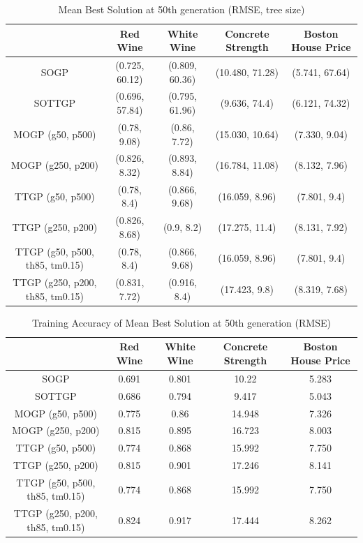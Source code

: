 \documentclass[a4paper, twocolumn]{article}
\begin{document}
\begin{table}[t]
	\begin{center}
		\caption{Mean Best Solution at 50th generation (RMSE, tree size)}
		\label{table:1}
		\begin{tabular}{ c|cccc }
			& Red Wine & White Wine & Concrete Strength & Boston House Price\\
			\hline
			SOGP &(0.725, 60.12)&(0.809, 60.36)&(10.480, 71.28)&(5.741, 67.64)\\
			SOTTGP &(0.696, 57.84)&(0.795, 61.96)&(9.636, 74.4)&(6.121, 74.32)\\
			MOGP (g50, p500) &(0.78, 9.08)&(0.86, 7.72)&(15.030, 10.64)&(7.330, 9.04)\\
			MOGP (g250, p200) &(0.826, 8.32)&(0.893, 8.84)&(16.784, 11.08)&(8.132, 7.96)\\
			TTGP (g50, p500) &(0.78, 8.4)&(0.866, 9.68)&(16.059, 8.96)&(7.801, 9.4)\\
			TTGP (g250, p200) &(0.826, 8.68)&(0.9, 8.2)&(17.275, 11.4)&(8.131, 7.92)\\
			TTGP (g50, p500, th85, tm0.15) &(0.78, 8.4)&(0.866, 9.68)&(16.059, 8.96)&(7.801, 9.4)\\
			TTGP (g250, p200, th85, tm0.15) &(0.831, 7.72)&(0.916, 8.4)&(17.423, 9.8)&(8.319, 7.68)\\
		\end{tabular}
	\end{center}
\end{table}
\begin{table}[t]
	\begin{center}
		\caption{Training Accuracy of Mean Best Solution at 50th generation (RMSE)}
		\label{table:2}
		\begin{tabular}{ c|cccc }
			& Red Wine & White Wine & Concrete Strength & Boston House Price\\
			\hline
			SOGP &0.691&0.801&10.22&5.283\\
			SOTTGP &0.686&0.794&9.417&5.043\\
			MOGP (g50, p500) &0.775&0.86&14.948&7.326\\
			MOGP (g250, p200) &0.815&0.895&16.723&8.003\\
			TTGP (g50, p500) &0.774&0.868&15.992&7.750\\
			TTGP (g250, p200) &0.815&0.901&17.246&8.141\\
			TTGP (g50, p500, th85, tm0.15) &0.774&0.868&15.992&7.750\\
			TTGP (g250, p200, th85, tm0.15) &0.824&0.917&17.444&8.262\\
		\end{tabular}
	\end{center}
\end{table}
\end{document}
